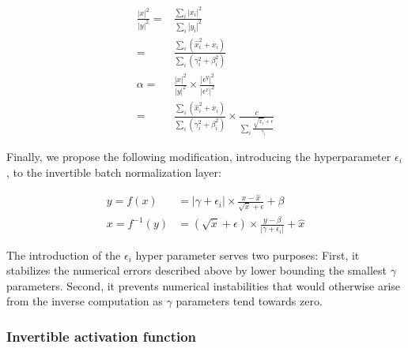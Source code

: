 \documentclass[twocolumn]{bmcart}
\begin{document}
\begin{subequations}
\begin{align}
\frac{|x|^2}{|y|^2} =& \frac{\sum_i |x_i|^2}{\sum_i|y_i|^2} \\
                    =& \frac{\sum_i (\hat{x}_i^2 + \dot{x_i})}{\sum_i (\gamma_i^2 + \beta_i^2)} \\
\alpha =& \frac{|x|^2}{|y|^2} \times  \frac{|\epsilon^y|^2}{|\epsilon^x|^2}  \\
       =& \frac{\sum_i (\hat{x}_i^2 + \dot{x_i})}{\sum_i (\gamma_i^2 + \beta_i^2)} \times \frac{c}{\sum_i \frac{\sqrt{\dot{x_i}}+\epsilon}{\gamma_i}}
\end{align}
\end{subequations}


Finally, we propose the following modification, introducing the hyperparameter $\epsilon_i$, to the invertible batch normalization layer:

\begin{subequations}
\begin{align}
y = f(x) &= |\gamma + \epsilon_i| \times \frac{x - \hat{x}}{\sqrt{\dot{x}} + \epsilon} + \beta \\
x = f^{-1}(y) &= (\sqrt{\dot{x}} + \epsilon) \times \frac{y -  \beta}{|\gamma + \epsilon_i|}  + \hat{x}
\end{align}
\end{subequations}

The introduction of the $\epsilon_i$ hyper parameter serves two purposes: 
First, it stabilizes the numerical errors described above by lower bounding the smallest $\gamma$ parameters. 
Second, it prevents numerical instabilities that would otherwise arise from the inverse computation as $\gamma$ parameters tend towards zero.

\subsubsection{Invertible activation function}
\end{document}
